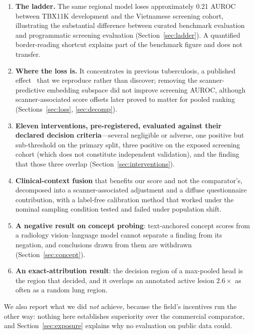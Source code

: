 \documentclass[11pt,a4paper]{article}
\begin{document}
\begin{enumerate}[leftmargin=1.6em,itemsep=0.1em]
\item \textbf{The ladder.} The same regional model loses approximately 0.21 AUROC between TBX11K development and the Vietnamese screening cohort, illustrating the substantial difference between curated benchmark evaluation and programmatic screening evaluation (Section~\ref{sec:ladder}). A quantified border-reading shortcut explains part of the benchmark figure and does not transfer.
\item \textbf{Where the loss is.} It concentrates in previous tuberculosis, a published effect~\cite{codlin2025,kagujje2023,qin2024} that we reproduce rather than discover; removing the scanner-predictive embedding subspace did not improve screening AUROC, although scanner-associated score offsets later proved to matter for pooled ranking (Sections~\ref{sec:loss}, \ref{sec:decomp}).
\item \textbf{Eleven interventions, pre-registered, evaluated against their declared decision criteria}---several negligible or adverse, one positive but sub-threshold on the primary split, three positive on the exposed screening cohort (which does not constitute independent validation), and the finding that those three overlap (Section~\ref{sec:interventions}).
\item \textbf{Clinical-context fusion} that benefits our score and not the comparator's, decomposed into a scanner-associated adjustment and a diffuse questionnaire contribution, with a label-free calibration method that worked under the nominal sampling condition tested and failed under population shift.
\item \textbf{A negative result on concept probing}: text-anchored concept scores from a radiology vision--language model cannot separate a finding from its negation, and conclusions drawn from them are withdrawn (Section~\ref{sec:concept}).
\item \textbf{An exact-attribution result}: the decision region of a max-pooled head is the region that decided, and it overlaps an annotated active lesion $2.6\times$ as often as a random lung region.
\end{enumerate}
We also report what we did \emph{not} achieve, because the field's incentives run the other way: nothing here establishes superiority over the commercial comparator, and Section~\ref{sec:exposure} explains why no evaluation on public data could.
\end{document}
